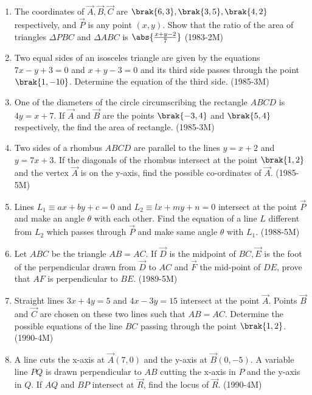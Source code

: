 \begin{enumerate}
  \item The coordinates of $\vec{A},\vec{B},\vec{C}$ are $ \brak{6,3}, \brak{3,5}, \brak{4,2} $ respectively, and $\vec{P}$ is any point $(x,y)$.
Show that the ratio of the area of triangles $\Delta PBC$  and $\Delta ABC$ is $\abs{\frac{x+y-2}{7}}$ \hfill{(1983-2M)} 

\item Two equal sides of an isosceles triangle are given by the equations $7x-y+3=0$ and $x+y-3=0$ and its third side passes through the point $\brak{1,-10}$. Determine the equation of the third side.  \hfill{(1985-3M)}

\item One of the diameters of the circle circumscribing the rectangle $ABCD$ is $4y=x+ 7$. If $\vec{A}$ and $\vec{B}$ are the points $\brak{-3,4}$ and $\brak{5,4}$ respectively, the find the area of rectangle.  \hfill{(1985-3M)}


\item Two sides of a rhombus $ABCD$ are parallel to the lines $y=x+2$ and $y=7x+3$. If the diagonals of the rhombus intersect at the point $\brak{1,2}$ and the vertex $\vec{A}$ is on the y-axis, find the possible co-ordinates of $\vec{A}$.     \hfill{(1985-5M)} 

\item Lines $ L_1 \equiv ax+by+c =0 $ and $ L_2 \equiv lx+my+n =0 $ intersect at the point $\vec{P}$ and make an angle $\theta$ with each other. Find the equation of a line $L$ different from $L_2$ which passes through $\vec{P}$ and make same angle $\theta$ with $L_1$. \hfill{(1988-5M)}


\item Let $ABC$ be the triangle $AB=AC$. If $\vec{D}$ is the midpoint of $ BC, \vec{E}$ is the foot of the perpendicular drawn from $\vec{D}$ to $AC$ and $\vec{F}$ the mid-point of $DE$, prove that $AF$ is perpendicular to $BE.$ \hfill{(1989-5M)}

\item Straight lines $3x + 4y =5$ and $ 4x-3y= 15$ intersect at the point $\vec{A}$. Points $\vec{B}$ and $\vec{C}$ are chosen on these two lines such that $AB=AC$. Determine the possible equations of the line $BC$ passing through the point $\brak{1,2}$.\hfill{(1990-4M)}

\item A line cuts the x-axis at $\vec{A}(7,0)$ and the y-axis at $\vec{B}(0,-5)$. A variable line $PQ$ is drawn perpendicular to $AB$ cutting the x-axis in $P$ and the y-axis in $Q$. If $AQ$ and $BP$ intersect at $\vec{R}$, find the locus of $\vec{R}$.  \hfill{(1990-4M)}


\end{enumerate}
